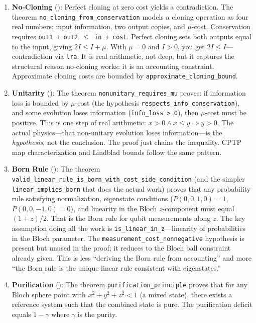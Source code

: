 \begin{enumerate}
    \item \textbf{No-Cloning} (): Perfect cloning at zero cost yields a contradiction. The theorem \texttt{no\_cloning\_from\_conservation} models a cloning operation as four real numbers: input information, two output copies, and $\mu$-cost. Conservation requires \texttt{out1 + out2 $\leq$ in + cost}. Perfect cloning sets both outputs equal to the input, giving $2I \leq I + \mu$. With $\mu = 0$ and $I > 0$, you get $2I \leq I$---contradiction via \texttt{lra}. It is real arithmetic, not deep, but it captures the structural reason no-cloning works: it is an accounting constraint. Approximate cloning costs are bounded by \texttt{approximate\_cloning\_bound}.
    
    \item \textbf{Unitarity} (): The theorem \texttt{nonunitary\_requires\_mu} proves: if information loss is bounded by $\mu$-cost (the hypothesis \texttt{respects\_info\_conservation}), and some evolution loses information (\texttt{info\_loss > 0}), then $\mu$-cost must be positive. This is one step of real arithmetic: $x > 0 \wedge x \leq y \Rightarrow y > 0$. The actual physics---that non-unitary evolution loses information---is the \textit{hypothesis}, not the conclusion. The proof just chains the inequality. CPTP map characterization and Lindblad bounds follow the same pattern.
    
    \item \textbf{Born Rule} (): The theorem \texttt{valid\_linear\_rule\_is\_born\_with\_cost\_side\_condition} (and the simpler \texttt{linear\_implies\_born} that does the actual work) proves that any probability rule satisfying normalization, eigenstate conditions ($P(0,0,1,0)=1$, $P(0,0,-1,0)=0$), and linearity in the Bloch $z$-component must equal $(1+z)/2$. That is the Born rule for qubit measurements along $z$. The key assumption doing all the work is \texttt{is\_linear\_in\_z}---linearity of probabilities in the Bloch parameter. The \texttt{measurement\_cost\_nonnegative} hypothesis is present but unused in the proof; it reduces to the Bloch ball constraint already given. This is less ``deriving the Born rule from accounting'' and more ``the Born rule is the unique linear rule consistent with eigenstates.''
    
    \item \textbf{Purification} (): The theorem \texttt{purification\_principle} proves that for any Bloch sphere point with $x^2 + y^2 + z^2 < 1$ (a mixed state), there exists a reference system such that the combined state is pure. The purification deficit equals $1 - \gamma$ where $\gamma$ is the purity.
    

\end{enumerate}

